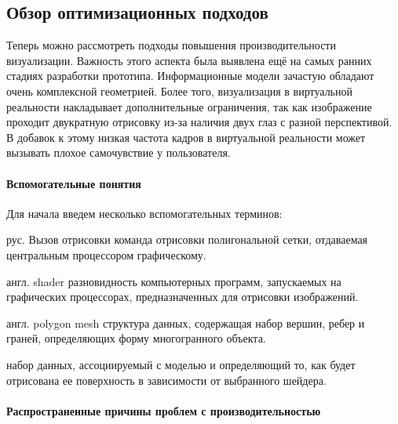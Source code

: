 ﻿\subsection{Обзор оптимизационных подходов}

Теперь можно рассмотреть подходы повышения производительности визуализации.
Важность этого аспекта была выявлена 
ещё на самых ранних стадиях разработки прототипа.
Информационные модели зачастую обладают очень комплексной геометрией.
Более того, визуализация в виртуальной реальности накладывает
дополнительные ограничения, так как изображение проходит двукратную отрисовку
из-за наличия двух глаз с разной перспективой.
В добавок к этому низкая частота кадров в виртуальной реальности
может вызывать плохое самочувствие у пользователя.%
\cite{Weech2019}

\paragraph{Вспомогательные понятия}

\begin{rglossary}
    Для начала введем несколько вспомогательных терминов:

    {рус. Вызов отрисовки}
    {команда отрисовки полигональной сетки,
    отдаваемая центральным процессором графическому.}

    {англ. shader}
    {разновидность компьютерных программ, запускаемых на графических процессорах,
    предназначенных для отрисовки изображений.}

    {англ. polygon mesh}
    {структура данных, содержащая набор вершин, ребер и граней,
    определяющих форму многогранного объекта.}

    {набор данных, ассоциируемый с моделью и
    определяющий то, как будет отрисована ее поверхность
    в зависимости от выбранного шейдера.}
\end{rglossary}

\paragraph{Распространенные причины проблем с производительностью}

